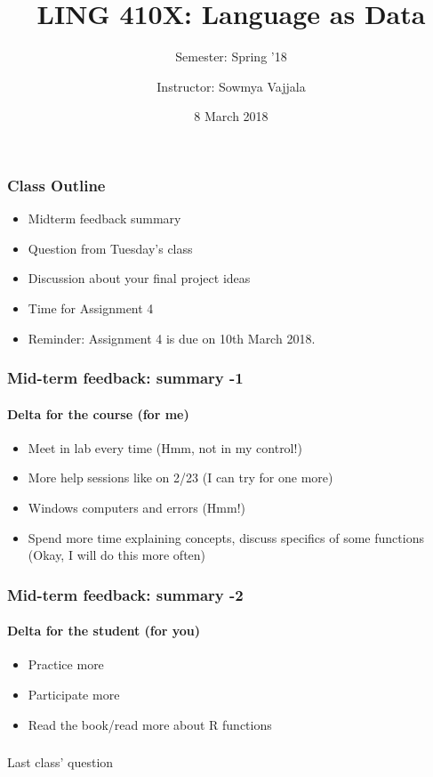 \documentclass{beamer}
\author[Sowmya Vajjala]{Instructor: Sowmya Vajjala}
\title[LING 410X]{LING 410X: Language as Data}
\subtitle{Semester: Spring '18}
\date{8 March 2018}
\institute{Iowa State University, USA}
\begin{document}
\begin{frame}\titlepage
\end{frame}

\begin{frame}
\frametitle{Class Outline}
\begin{itemize}
\item Midterm feedback summary
\item Question from Tuesday's class
\item Discussion about your final project ideas
\item Time for Assignment 4 
\item Reminder: Assignment 4 is due on 10th March 2018.
\end{itemize}
\end{frame}

\begin{frame}
\frametitle{Mid-term feedback: summary -1}
\framesubtitle{Delta for the course (for me)}
\begin{itemize}
\item Meet in lab every time (Hmm, not in my control!)
\item More help sessions like on 2/23 (I can try for one more)
\item Windows computers and errors (Hmm!)
\item Spend more time explaining concepts, discuss specifics of some functions (Okay, I will do this more often)
\end{itemize}
\end{frame}

\begin{frame}
\frametitle{Mid-term feedback: summary -2}
\framesubtitle{Delta for the student (for you)}
\begin{itemize}
\item Practice more 
\item Participate more
\item Read the book/read more about R functions
\end{itemize}
\end{frame}

\begin{frame}
\frametitle{}
\Large Last class' question
\end{frame}
\end{document}
